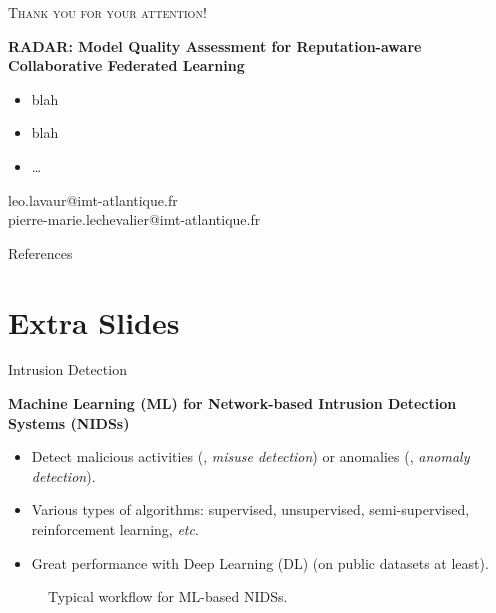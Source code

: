 \documentclass[aspectratio=169,10pt]{imta}
\begin{document}
\begin{frame}
  \centering\scshape\large Thank you for your attention!

  \vfill
  
  \normalshape\normalsize

  \textbf{RADAR: Model Quality Assessment for Reputation-aware Collaborative Federated Learning}
  \medskip
  \raggedright
  \begin{itemize}
    \item blah
    \item blah
    \item \dots
  \end{itemize}

  \vfill

  \centering\small
  leo.lavaur@imt-atlantique.fr\\
  pierre-marie.lechevalier@imt-atlantique.fr

\end{frame}


\appendix

\begin{frame}[allowframebreaks]{References}
  \printbibliography[heading=none]
\end{frame}


\section*{Extra Slides}

\begin{frame}
  \sectionpage
\end{frame}

\begin{frame}{Intrusion Detection}
  
  \textbf{Machine Learning (ML) for Network-based Intrusion Detection Systems (NIDSs)}
  \begin{itemize}
    \item Detect \alert{malicious} activities (\ie, \textit{misuse detection}) or \alert{anomalies} (\ie, \textit{anomaly detection}).
    \item Various types of algorithms: \alert<2>{supervised}, unsupervised, semi-supervised, reinforcement learning, \textit{etc}.
    \item Great performance with Deep Learning (DL) (on public datasets at least).
  \end{itemize}
  \bigskip
    
  \begin{figure}
    \centering
    \caption{Typical workflow for ML-based NIDSs.}
  \end{figure}
\end{frame}
\end{document}
